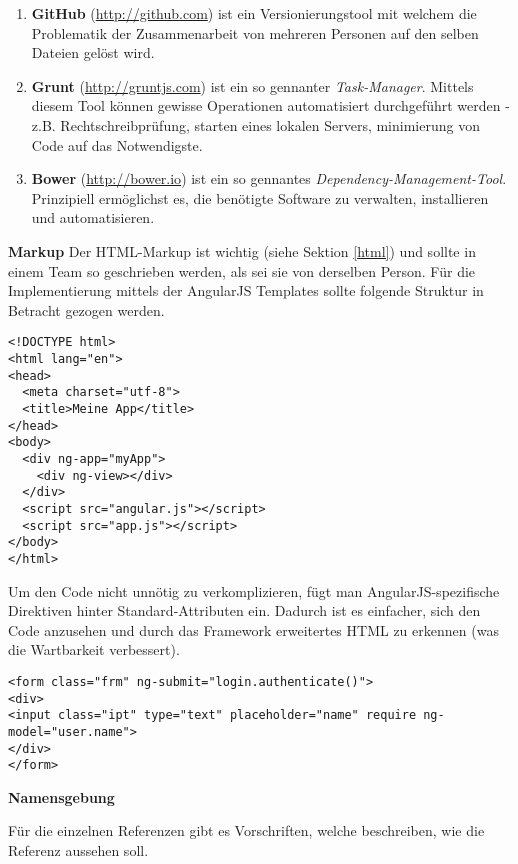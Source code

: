 \begin{enumerate}
\item \textbf{GitHub} (\url{http://github.com}) ist ein Versionierungstool mit welchem die Problematik der Zusammenarbeit von mehreren Personen auf den selben Dateien gelöst wird.
\item \textbf{Grunt} (\url{http://gruntjs.com}) ist ein so gennanter \textit{Task-Manager}. Mittels diesem Tool können gewisse Operationen automatisiert durchgeführt werden - z.B. Rechtschreibprüfung, starten eines lokalen Servers, minimierung von Code auf das Notwendigste.
\item \textbf{Bower} (\url{http://bower.io}) ist ein so gennantes \textit{Dependency-Management-Tool}. Prinzipiell ermöglichst es, die benötigte Software zu verwalten, installieren und automatisieren.
\end{enumerate}

\clearpage

\textbf{Markup\newline}
Der HTML-Markup ist wichtig (siehe Sektion \ref{html}) und sollte in einem Team so geschrieben werden, als sei sie von derselben Person. Für die Implementierung mittels der AngularJS Templates sollte folgende Struktur in Betracht gezogen werden.

\begin{lstlisting}
<!DOCTYPE html>
<html lang="en">
<head>
  <meta charset="utf-8">
  <title>Meine App</title>
</head>
<body>
  <div ng-app="myApp">
    <div ng-view></div>
  </div>
  <script src="angular.js"></script>
  <script src="app.js"></script>
</body>
</html>
\end{lstlisting}


Um den Code nicht unnötig zu verkomplizieren, fügt man AngularJS-spezifische Direktiven hinter Standard-Attributen ein. Dadurch ist es einfacher, sich den Code anzusehen und durch das Framework erweitertes HTML zu erkennen (was die Wartbarkeit verbessert).

\begin{lstlisting}
<form class="frm" ng-submit="login.authenticate()">
<div>
<input class="ipt" type="text" placeholder="name" require ng-model="user.name">
</div>
</form>
\end{lstlisting}


\textbf{Namensgebung\newline}

Für die einzelnen Referenzen gibt es Vorschriften, welche beschreiben, wie die Referenz aussehen soll.

